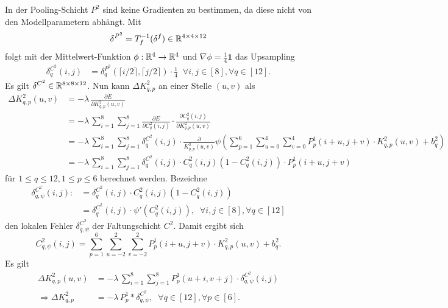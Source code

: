 In der Pooling-Schicht $P^2$ sind keine Gradienten zu bestimmen, da diese nicht von den Modellparametern abhängt. Mit
\begin{equation*}
    \delta^{P^2}=T_f^{-1}(\delta^f) \in \mathbb{R}^{4 \times 4 \times 12}
\end{equation*}
folgt mit der Mittelwert-Funktion $
\phi:\mathbb{R}^4 \rightarrow \mathbb{R}^4$ und $\nabla \phi=\frac{1}{4} \mathbf{1}$ das Upsampling
\begin{align*}
    \delta^{C^2}_q(i,j)&= \delta^{P^2}_q\left( \lceil i/2 \rceil, \lceil j/2 \rceil\right) \cdot \frac{1}{4} \; \; \forall i,j \in [8], \forall q \in [12].
\end{align*}
Es gilt $\delta^{C^2} \in \mathbb{R}^{8 \times 8 \times 12}$. Nun kann $\Delta K^2_{q,p}$ an einer Stelle $(u,v)$ als
\begin{align*}
    \Delta K^2_{q,p}(u,v) &= -\lambda \, \frac{\partial E}{\partial K^2_{q,p}(u,v)} \\
                          &= -\lambda \, \sum_{i=1}^8 \sum_{j=1}^8 \frac{\partial E}{\partial C^2_q(i,j)} \cdot \frac{\partial C^2_q(i,j)}{\partial K_{q,p}^2(u,v)} \\
                          &= -\lambda \, \sum_{i=1}^8 \sum_{j=1}^8 \delta_q^{C^2}(i,j) \cdot \frac{\partial}{ K^2_{q,p}(u,v)} \psi \left( \sum_{p=1}^6 \sum_{u=0}^4 \sum_{v=0}^4 P^1_p(i+u,j+v) \cdot K_{q,p}^2(u,v) +b_q^2\right) \\
                          &= -\lambda \, \sum_{i=1}^8 \sum_{j=1}^8 \delta_q^{C^2}(i,j) \cdot C_q^2(i,j)\left(1-C_q^2(i,j)\right) \cdot P^1_p(i+u,j+v)
\end{align*}
für $1 \leq q \leq 12, 1 \leq p \leq 6$ berechnet werden.
Bezeichne
\begin{align*}
    \delta^{C^2}_{q,\psi}(i,j):&= \delta^{C^2}_q(i,j) \cdot C_q^2(i,j)\left(1- C_q^2(i,j)\right)\\
    &= \delta^{C^2}_q(i,j) \cdot \psi'(C^2_q(i,j)), \; \; \forall i,j \in [8], \forall q \in [12]
\end{align*} den lokalen Fehler $\delta^{C^2}_{q,\psi}$ der Faltungschicht $C^2$. Damit ergibt sich
\begin{equation*}
    C_{q,\psi}^2(i,j)=\sum_{p=1}^6 \sum_{u=-2}^2 \sum_{v=-2}^2 P^1_p(i+u,j+v) \cdot K^2_{q,p}(u,v) +b_q^2.
\end{equation*}
Es gilt
\begin{align*}
    \Delta K^2_{q,p}(u,v) &= - \lambda \, \sum_{i=1}^8 \sum_{j=1}^8 P^1_{p}(u+i,v+j) \cdot \delta^{C^2}_{q,\psi}(i,j) \\
     \Rightarrow \Delta K_{q,p}^2 &=- \lambda \, P^1_{p} \ast \delta^{C^2}_{q,\psi} , \; \; \forall q \in [12], \forall p \in [6].
\end{align*}
